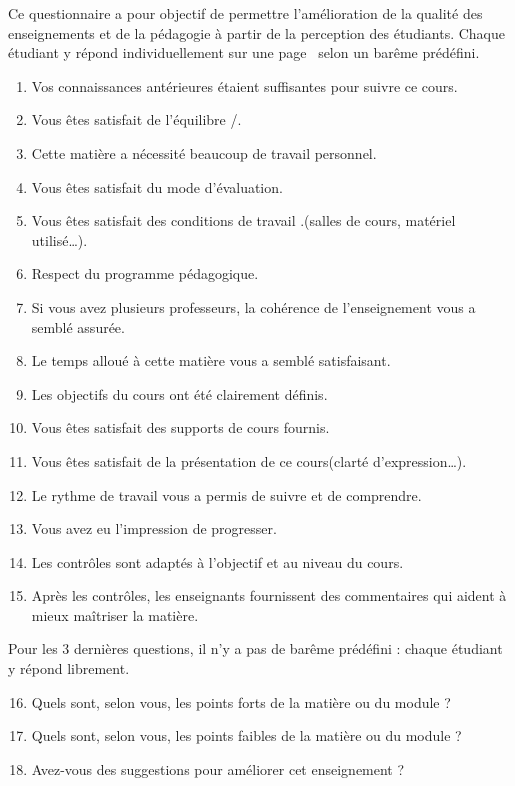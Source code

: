 Ce questionnaire a pour objectif de permettre l’amélioration de la qualité des 
enseignements et de la pédagogie à partir de la perception des étudiants.
Chaque étudiant y répond individuellement sur une page \web\ selon un barême
prédéfini.
\begin{enumerate}
\item Vos connaissances antérieures étaient suffisantes pour suivre ce cours.
\item Vous êtes satisfait de l'équilibre \ctd/\labo.
\item Cette matière a nécessité beaucoup de travail personnel.
\item Vous êtes satisfait du mode d'évaluation.
\item Vous êtes satisfait des conditions de travail .(salles de cours, matériel utilisé\ldots).
\item Respect du programme pédagogique.
\item Si vous avez plusieurs professeurs, la cohérence de l'enseignement vous a semblé assurée.
\item Le temps alloué à cette matière vous a semblé satisfaisant.
\item Les objectifs du cours ont été clairement définis.
\item Vous êtes satisfait des supports de cours fournis.
\item Vous êtes satisfait de la présentation de ce cours(clarté d'expression\ldots).
\item Le rythme de travail vous a permis de suivre et de comprendre.
\item Vous avez eu l'impression de progresser.
\item Les contrôles sont adaptés à l'objectif et au niveau du cours.
\item Après les contrôles, les enseignants fournissent des commentaires qui aident à mieux maîtriser la matière.
\end{enumerate}
Pour les 3 dernières questions, il n'y a pas de barême prédéfini : chaque étudiant y répond librement.
\begin{enumerate}\setcounter{enumi}{15}
\item Quels sont, selon vous, les points forts de la matière ou du module ?
\item Quels sont, selon vous, les points faibles de la matière ou du module ?
\item Avez-vous des suggestions pour améliorer cet enseignement ?
\end{enumerate}

